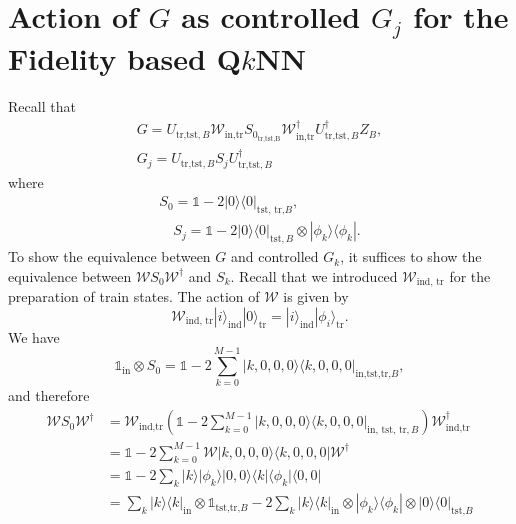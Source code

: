 \documentclass[a4paper,twocolumn,11pt,unpublished]{quantumarticle}
\newcommand{\rang}{\rangle}
\newcommand{\lang}{\langle}
\begin{document}
\section{Action of $G$ as controlled $G_j$ for the Fidelity based  Q$k$NN}
\label{G_and_G_k}
    Recall that
    \begin{gather}
        G = U_{\text{tr,tst},B} \mathcal W_{\text{in,tr}}S_{0_{\text{tr,tst,B}}} \mathcal W^\dag_{\text{in,tr}} U^\dag_{\text{tr,tst},B} Z_B,\\
        G_j = U_{\text{tr,tst},B}S_j U_{\text{tr,tst},B}^\dag
        \end{gather}
    where
    \begin{gather}
        S_0 = \mathds{1}  - 2|0\rang\lang0|_{\text{tst, tr,}B},\\ \quad S_j = \mathds{1}  - 2|0\rang\lang0|_{\text{tst}, B} \otimes |\phi_k\rang\lang \phi_k|.
    \end{gather}
    To show the equivalence between $G$ and controlled $G_k$, it suffices to show the equivalence between $\mathcal W S_0 \mathcal W ^\dag$  and $S_k$. Recall that we introduced $\mathcal W_{\text{ind, tr}}$  for the preparation of train states. The action of $\mathcal W$ is given by 
    \begin{equation}
        \mathcal W_{\text{ind, tr}} |i\rang_{\text{ind}}|0\rang_{\text{tr}} = |i\rang_{\text{ind}}|\phi_i\rang_{\text{tr}}.
    \end{equation}
    We have
    \begin{equation}
        \mathds{1}_{\text{in}}\otimes S_0 = \mathds{1}  - 2\sum_{k = 0}^{M-1}|k,0,0,0\rang\lang k, 0,0,0|_{\text{in,tst,tr,}B},
    \end{equation}
    and therefore
    \begin{equation}
    \begin{split}
        \mathcal W S_0 \mathcal W ^\dag &= \mathcal W_{{\text{ind,tr}}}  \left(\mathds{1}  - 2\sum_{k=0}^{M-1}|k,0,0,0\rang\lang k,0,0,0|_{\text{in, tst, tr},B}\right) \mathcal W ^\dag_{\text{ind,tr}} 
        \\&= \mathds{1}  - 2 \sum_{k=0}^{M-1}\mathcal W |k,0,0,0\rang \lang k, 0,0,0|\mathcal W ^\dag \\
         &= \mathds{1}  - 2\sum_k| k\rangle | \phi_k \rangle | 0,0\rang \lang k| \langle \phi_k | \langle 0,0| \\
        &=\sum_k |k\rang \lang k|_\text{in} \otimes \mathds{1}_{\text{tst,tr,}B} - 2\sum_k |k\rang \lang k|_\text{in} \otimes |\phi_k\rang \lang \phi_k| \otimes |0\rang \lang 0|_{\text{tst,}B}\\
    \end{split}
    \end{equation}
\end{document}
